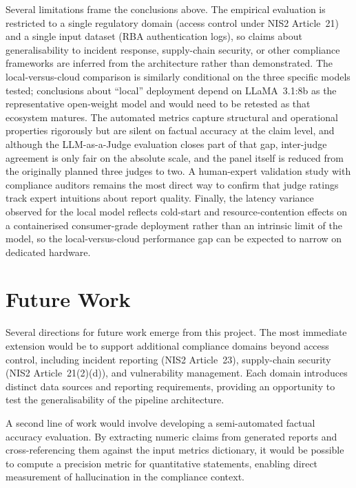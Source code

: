 \documentclass[]{UCD_CS_FYP_Report}
\begin{document}
Several limitations frame the conclusions above. The empirical evaluation is restricted to a single regulatory domain (access control under NIS2 Article~21) and a single input dataset (RBA authentication logs), so claims about generalisability to incident response, supply-chain security, or other compliance frameworks are inferred from the architecture rather than demonstrated. The local-versus-cloud comparison is similarly conditional on the three specific models tested; conclusions about ``local'' deployment depend on LLaMA~3.1:8b as the representative open-weight model and would need to be retested as that ecosystem matures. The automated metrics capture structural and operational properties rigorously but are silent on factual accuracy at the claim level, and although the LLM-as-a-Judge evaluation closes part of that gap, inter-judge agreement is only fair on the absolute scale, and the panel itself is reduced from the originally planned three judges to two. A human-expert validation study with compliance auditors remains the most direct way to confirm that judge ratings track expert intuitions about report quality. Finally, the latency variance observed for the local model reflects cold-start and resource-contention effects on a containerised consumer-grade deployment rather than an intrinsic limit of the model, so the local-versus-cloud performance gap can be expected to narrow on dedicated hardware.

\section{Future Work}
\label{sec:conclusion_future_work}

Several directions for future work emerge from this project. The most immediate extension would be to support additional compliance domains beyond access control, including incident reporting (NIS2 Article~23), supply-chain security (NIS2 Article~21(2)(d)), and vulnerability management. Each domain introduces distinct data sources and reporting requirements, providing an opportunity to test the generalisability of the pipeline architecture.

A second line of work would involve developing a semi-automated factual accuracy evaluation. By extracting numeric claims from generated reports and cross-referencing them against the input metrics dictionary, it would be possible to compute a precision metric for quantitative statements, enabling direct measurement of hallucination in the compliance context.
\end{document}
